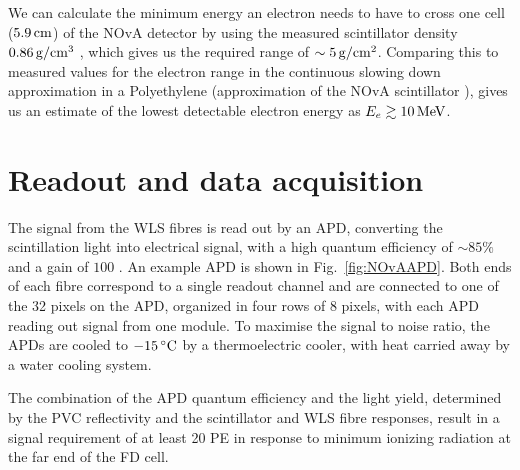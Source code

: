 We can calculate the minimum energy an electron needs to have to cross one cell ($\unit[5.9]{cm}$) of the \gls{NOvA} detector by using the measured scintillator density $\unit[0.86]{g/cm^3}$ \cite{NOvA-doc-11886}, which gives us the required range of $\sim\unit[5]{g/cm^2}$. Comparing this to measured values for the electron range \cite{NISTParticleRangeTables} in the continuous slowing down approximation in a Polyethylene (approximation of the \gls{NOvA} scintillator \cite{NOvA-doc-13579-FACalorimetricEnergyScale}), gives us an estimate of the lowest detectable electron energy as $E_{e}\gtrsim\unit[10]{MeV}$.

\section{Readout and data acquisition}\label{sec:DAQ}

The signal from the \gls{WLS} fibres is read out by an \gls{APD}, converting the scintillation light into electrical signal, with a high quantum efficiency of $\sim 85\%$ and a gain of $100$ \cite{NOvATechreport.pdf}. An example \gls{APD} is shown in Fig.~\ref{fig:NOvAAPD}. Both ends of each fibre correspond to a single readout channel and are connected to one of the 32 pixels on the \gls{APD}, organized in four rows of 8 pixels, with each \gls{APD} reading out signal from one module. To maximise the signal to noise ratio, the \glspl{APD} are cooled to $\unit[-15]{\degree C}$ by a thermoelectric cooler, with heat carried away by a water cooling system.

The combination of the \gls{APD} quantum efficiency and the light yield, determined by the \gls{PVC} reflectivity and the scintillator and \gls{WLS} fibre responses, result in a signal requirement of at least 20 \gls{PE} in response to minimum ionizing radiation at the far end of the \gls{FD} cell.

